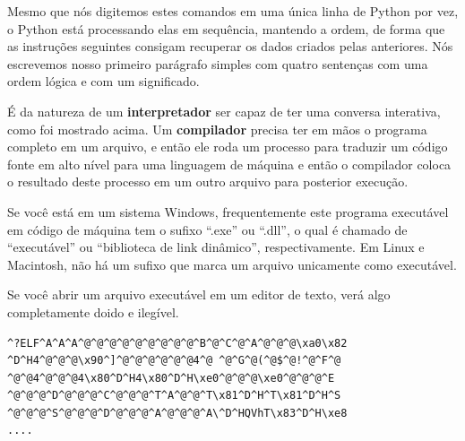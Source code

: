 Mesmo que nós digitemos estes comandos em uma única linha de Python por vez, o Python
está processando elas em sequência, mantendo a ordem, de forma que as
instruções seguintes consigam recuperar os dados criados pelas anteriores. Nós escrevemos
nosso primeiro parágrafo simples com quatro sentenças com uma ordem lógica e com um
significado.
%

É da natureza de um {\bf interpretador} ser capaz de ter uma conversa interativa, como
foi mostrado acima. Um {\bf compilador} precisa ter em mãos o programa completo em um arquivo,
e então ele roda um processo para traduzir um código fonte em alto nível para uma linguagem
de máquina e então o compilador coloca o resultado deste processo em um outro arquivo
para posterior execução.
%

Se você está em um sistema Windows, frequentemente este programa executável em código
de máquina tem o sufixo ``.exe'' ou ``.dll'', o qual é chamado de ``executável'' ou
``biblioteca de link dinâmico'', respectivamente. Em Linux e Macintosh, não há um sufixo
que marca um arquivo unicamente como executável.
%

Se você abrir um arquivo executável em um editor de texto, verá algo completamente
doido e ilegível.
%

\beforeverb
\begin{verbatim}
^?ELF^A^A^A^@^@^@^@^@^@^@^@^@^B^@^C^@^A^@^@^@\xa0\x82
^D^H4^@^@^@\x90^]^@^@^@^@^@^@4^@ ^@^G^@(^@$^@!^@^F^@
^@^@4^@^@^@4\x80^D^H4\x80^D^H\xe0^@^@^@\xe0^@^@^@^E
^@^@^@^D^@^@^@^C^@^@^@^T^A^@^@^T\x81^D^H^T\x81^D^H^S
^@^@^@^S^@^@^@^D^@^@^@^A^@^@^@^A\^D^HQVhT\x83^D^H\xe8
....
\end{verbatim}
\afterverb

